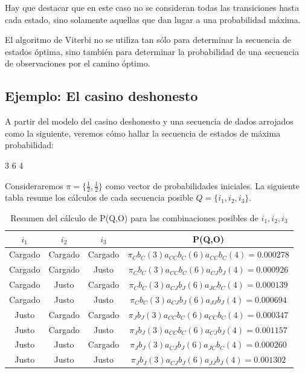 Hay que destacar que en este caso no se consideran todas las transiciones hasta cada estado, sino solamente aquellas que dan lugar a una probabilidad máxima.

El algoritmo de Viterbi no se utiliza tan sólo para determinar la secuencia de estados óptima, sino también para determinar la probabilidad de una secuencia de observaciones por el camino óptimo.

\subsection{Ejemplo: El casino deshonesto}
A partir del modelo del casino deshonesto y una secuencia de dados arrojados como la siguiente, veremos cómo hallar la secuencia de estados de máxima probabilidad:

3 6 4 

Consideraremos $\pi = \{\frac{1}{2}, \frac{1}{2}\}$ como vector de probabilidades iniciales. La siguiente tabla resume los cálculos de cada secuencia posible $Q=\{i_1, i_2, i_3\}$.


\begin{table}[!htp]
\centering
\begin{tabular}{|c|c|c|c|}
\hline
\rowcolor[HTML]{EAEAEA} 
$i_1$     & $i_2$     & $i_3$     & P(Q,O)                                       \\ \hline
Cargado & Cargado & Cargado & $\pi_Cb_C(3)a_{CC}b_C(6)a_{CC}b_C(4)=0.000278$ \\ \hline
Cargado & Cargado & Justo   & $\pi_Cb_C(3)a_{CC}b_C(6)a_{CJ}b_J(4)=0.000926$ \\ \hline
Cargado & Justo   & Cargado & $\pi_Cb_C(3)a_{CJ}b_J(6)a_{JC}b_C(4)=0.000139$ \\ \hline
Cargado & Justo   & Justo   & $\pi_Cb_C(3)a_{CJ}b_J(6)a_{JJ}b_J(4)=0.000694$ \\ \hline
Justo   & Cargado & Cargado & $\pi_Jb_J(3)a_{CC}b_C(6)a_{CC}b_C(4)=0.000347$ \\ \hline
Justo   & Cargado & Justo   & $\pi_Jb_J(3)a_{CC}b_C(6)a_{CJ}b_J(4)=0.001157$ \\ \hline
Justo   & Justo   & Cargado & $\pi_Jb_J(3)a_{CJ}b_J(6)a_{JC}b_C(4)=0.000260$ \\ \hline
\rowcolor[HTML]{ECF4FF} 
Justo   & Justo   & Justo   & $\pi_Jb_J(3)a_{CJ}b_J(6)a_{JJ}b_J(4)=0.001302$ \\ \hline
\end{tabular}
\caption{Resumen del cálculo de P(Q,O) para las combinaciones posibles de $i_1, i_2, i_3$}
\label{tbl:stateSeqEvaluation}
\end{table}

